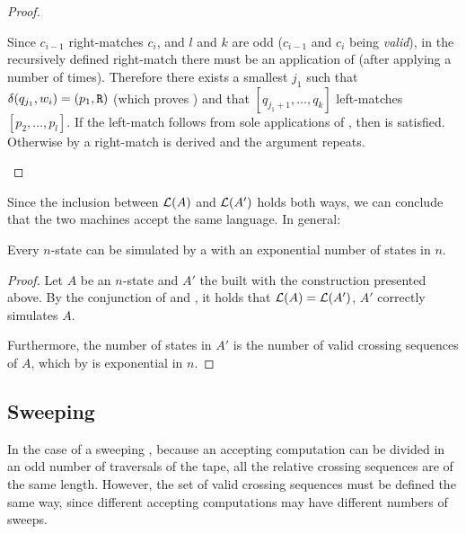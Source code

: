 \begin{proof}
\begin{description}
		      Since $c_{i-1}$ right-matches $c_i$, and $l$ and $k$ are odd ($c_{i-1}$ and $c_i$ being \emph{valid}), in the recursively defined right-match there must be an application of  (after applying  a number of times).
		      Therefore there exists a smallest $j_1$ such that $\delta(q_{j_1},w_i)=(p_1,\mathtt R)$ (which proves ) and that $[q_{j_1+1},\dots,q_k]$ left-matches $[p_2,\dots,p_l]$.
		      If the left-match follows from sole applications of , then  is satisfied.
		      Otherwise by  a right-match is derived and the argument repeats. \qedhere
	\end{description}
\end{proof}

Since the inclusion between $\mathcal L(A)$ and $\mathcal L(A')$ holds both ways, we can conclude that the two machines accept the same language.
In general:
\begin{thrm}\label{thm:2DFAto1NFA}
	Every $n$-state \TDFA can be simulated by a \ONFA with an exponential number of states in $n$.
\end{thrm}
\begin{proof}
	Let $A$ be an $n$-state \TDFA and $A'$ the \ONFA built with the construction presented above.
	By the conjunction of  and , it holds that $\mathcal L(A)=\mathcal L(A')$, \ie $A'$ correctly simulates $A$.

	Furthermore, the number of states in $A'$ is the number of valid crossing sequences of $A$, which by  is exponential in $n$.
\end{proof}



\subsection{Sweeping \TDFAs}
In the case of a sweeping \TDFA, because an accepting computation can be divided in an odd number of traversals of the tape, all the relative crossing sequences are of the same length.
However, the set of valid crossing sequences must be defined the same way, since different accepting computations may have different numbers of sweeps.



